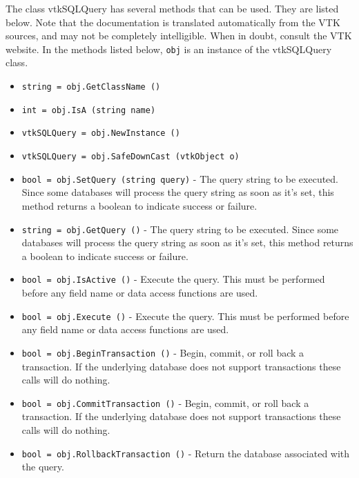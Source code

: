 The class vtkSQLQuery has several methods that can be used.
  They are listed below.
Note that the documentation is translated automatically from the VTK sources,
and may not be completely intelligible.  When in doubt, consult the VTK website.
In the methods listed below, \verb|obj| is an instance of the vtkSQLQuery class.
\begin{itemize}
\item  \verb|string = obj.GetClassName ()|

\item  \verb|int = obj.IsA (string name)|

\item  \verb|vtkSQLQuery = obj.NewInstance ()|

\item  \verb|vtkSQLQuery = obj.SafeDownCast (vtkObject o)|

\item  \verb|bool = obj.SetQuery (string query)| -  The query string to be executed.  Since some databases will
 process the query string as soon as it's set, this method returns
 a boolean to indicate success or failure.

\item  \verb|string = obj.GetQuery ()| -  The query string to be executed.  Since some databases will
 process the query string as soon as it's set, this method returns
 a boolean to indicate success or failure.

\item  \verb|bool = obj.IsActive ()| -  Execute the query.  This must be performed
 before any field name or data access functions
 are used.

\item  \verb|bool = obj.Execute ()| -  Execute the query.  This must be performed
 before any field name or data access functions
 are used.

\item  \verb|bool = obj.BeginTransaction ()| -  Begin, commit, or roll back a transaction.  If the underlying
 database does not support transactions these calls will do
 nothing.

\item  \verb|bool = obj.CommitTransaction ()| -  Begin, commit, or roll back a transaction.  If the underlying
 database does not support transactions these calls will do
 nothing.

\item  \verb|bool = obj.RollbackTransaction ()| -  Return the database associated with the query.


\end{itemize}
